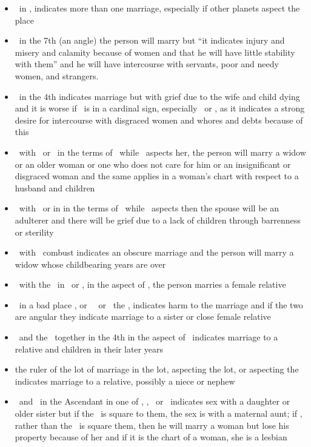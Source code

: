 \begin{itemize}
\item \Venus\, in \Libra, indicates more than one marriage, especially if other planets aspect the place
\item \Venus\, in the 7th (an angle) the person will marry but ``it indicates injury and misery and calamity because of women and that he will have little stability with them'' and he will have intercourse with servants, poor and needy women, and strangers.
\item \Venus\, in the 4th indicates marriage but with grief due to the wife and child dying and it is worse if \Venus\, is in a cardinal sign, especially \Cancer\, or \Capricorn, as it indicates a strong desire for intercourse with disgraced women and whores and debts because of this
\item \Saturn\, with \Venus\, or \Venus\, in the terms of \Saturn\, while \Saturn\, aspects her, the person will marry a widow or an older woman or one who does not care for him or an insignificant or disgraced woman and the same applies in a woman's chart with respect to a husband and children
\item \Venus\, with \Mars\, or in in the terms of \Mars\, while \Mars\, aspects then the spouse will be an adulterer and there will be grief due to a lack of children through barrenness or sterility

\item \Venus\, with \Jupiter\, combust indicates an obscure marriage and the person will marry a widow whose childbearing years are over
\item \Venus\, with the \Moon\, in \Cancer\, or \Taurus, in the aspect of \Jupiter, the person marries a female relative

\item \Venus\, in a bad place \Conjunction\Moon, or \Venus\, \Square\, or \Opposition\, the \Moon, indicates harm to the marriage and if the two are angular they indicate marriage to a sister or close female relative

\item \Venus\, and the \Moon\, together in the 4th in the aspect of \Jupiter\, indicates marriage to a relative and children in their later years

\item the ruler of the lot of marriage in the lot, aspecting the lot, or aspecting the \Moon\, indicates marriage to a relative, possibly a niece or nephew

\item \Saturn\, and \Venus\, in the Ascendant in one of \Taurus, \Libra, \Capricorn\, or \Aquarius\, indicates sex with a daughter or older sister but if the \Moon\, is square to them, the sex is with a maternal aunt; if \Mars, rather than the \Moon\, is square them, then he will marry a woman but lose his property because of her and if it is the chart of a woman, she is a lesbian


\end{itemize}
